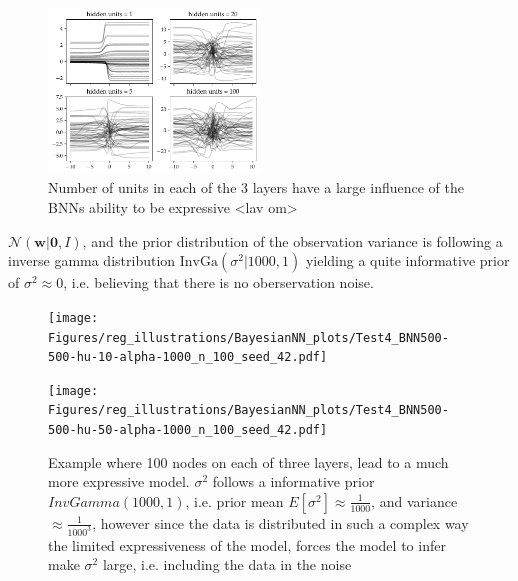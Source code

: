 \begin{figure}[H]
    \centering
    \includegraphics[width=0.5\textwidth]{Pictures/bayesian_nn_prior_samples_hidden_units.pdf}
    \caption{Number of units in each of the 3 layers have a large influence of the BNNs ability to be expressive <lav om>}
    \label{n_unit_BNN}
\end{figure}


$\mathcal{N}(\textbf{w}|\bm{0},I)$, and the prior distribution of the observation
variance is following a inverse gamma distribution $\text{InvGa}(\sigma^2|1000,1)$ yielding a quite 
informative prior of $\sigma^2 \approx 0$, i.e. believing that there is no oberservation noise.

\begin{figure}[h]
    \centering
    \begin{minipage}[b]{0.49\textwidth}
     \texttt{[image: Figures/reg\_illustrations/BayesianNN\_plots/Test4\_BNN500-500-hu-10-alpha-1000\_n\_100\_seed\_42.pdf]}
    \end{minipage}
    \hfill
    \begin{minipage}[b]{0.49\textwidth}
      \texttt{[image: Figures/reg\_illustrations/BayesianNN\_plots/Test4\_BNN500-500-hu-50-alpha-1000\_n\_100\_seed\_42.pdf]}
     \end{minipage}
     \caption{Example where 100 nodes on each of three layers, lead to a much more expressive model.
     $\sigma^2$ follows a informative prior $InvGamma(1000,1)$, i.e. prior mean $E[\sigma^2] \approx
     \frac{1}{1000}$, and variance $\approx \frac{1}{1000^3}$, however since the data is distributed in such 
     a complex way the limited expressiveness of the model, forces the model to infer make $\sigma^2$ large, 
     i.e. including the data in the noise}
\end{figure}




